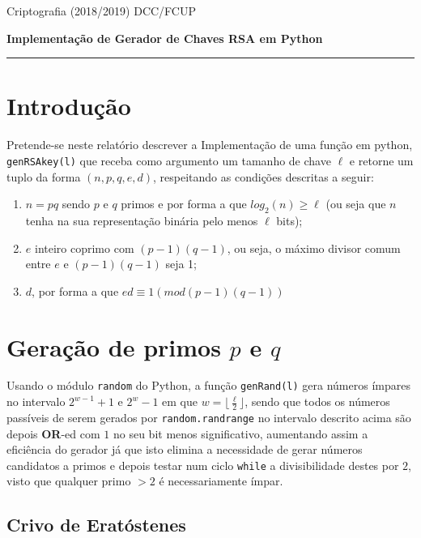 \documentclass[dvipsnames]{article}
\begin{document}
\noindent Criptografia (2018/2019)
\hfill DCC/FCUP

\begin{center}\LARGE\bf 
  Implementação de Gerador de Chaves RSA em Python \\
\end{center}

\vskip 0.4cm
\hrule
\vskip 0.4cm

\begin{multicols}{2}
  \section{Introdução}
  Pretende-se neste relatório descrever a Implementação de uma função em python, \texttt{genRSAkey(l)} que receba como argumento um tamanho de chave $\ell$ e retorne um tuplo da forma $(n,p,q,e,d)$, respeitando as condições descritas a seguir:
  \begin{enumerate}
    \item $n=pq$ sendo $p$ e $q$ primos e por forma a que $log_2(n) \geq \ell$ (ou seja que $n$ tenha na sua representação binária pelo menos $\ell$ bits);
    \item $e$ inteiro coprimo com $(p-1)(q-1)$, ou seja, o máximo divisor comum entre $e$ e $(p-1)(q-1)$ seja 1;
    \item $d$, por forma a que $ed \equiv 1 (mod (p-1)(q-1))$
  \end{enumerate}
  
  \section{Geração de primos $p$ e $q$}
  Usando o módulo \texttt{random} do Python, a função \texttt{genRand(l)} gera números ímpares no intervalo $2^{w-1} + 1$ e $2^{w} - 1$ em que $w=\lfloor \frac{\ell}{2} \rfloor$, sendo que todos os números passíveis de serem gerados por \texttt{random.randrange} no intervalo descrito acima são depois \textbf{OR}-ed com $1$ no seu bit menos significativo, aumentando assim a eficiência do gerador já que isto elimina a necessidade de gerar números candidatos a primos e depois testar num ciclo \texttt{while} a divisibilidade destes por $2$, visto que qualquer primo $>2$ é necessariamente ímpar.
  
  \vskip 0.4cm
  
  \subsection{Crivo de Eratóstenes}
  

\end{multicols}
\end{document}
